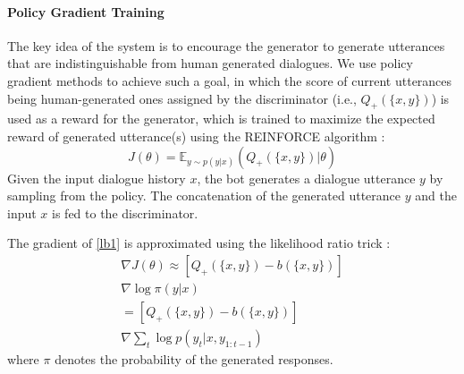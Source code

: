 \paragraph{Policy Gradient Training}
 The key idea of the system is to encourage the generator to generate utterances that are indistinguishable from human generated dialogues. We use policy gradient methods to achieve such a goal, in which the 
score of current utterances being human-generated ones assigned by the discriminator
(i.e.,  $Q_+(\{x,y\})$)
 is used as a reward for the generator, which is trained to maximize the expected reward of generated utterance(s) using the REINFORCE algorithm \cite{williams1992simple}:
 \begin{equation}
 J(\theta)=\mathbb{E}_{y\sim p(y|x)}(Q_+(\{x,y\})|\theta)
 \label{lb1}
 \end{equation}
Given the input dialogue history $x$, the  bot generates a dialogue utterance $y$ by sampling from the policy. 
The concatenation of the generated utterance $y$ and the input $x$ is fed to the discriminator. 
\begin{comment}
For multi-turn simulation, the second bot updates the dialogue history $x$ by adding 
the previous generated utterance, then samples another sequence $y'$  from the policy given the updated dialogue history $x$. 
The two bots take turns talking to each other (i.e.,
doing encoding and decoding) until the maximum number of simulation turns is reached. 
The discriminator then assigns a score to the entire simulated dialogue.
 \end{comment}
 The gradient of \eqref{lb1} is approximated using the likelihood ratio trick \cite{williams1992simple,glynn1990likelihood,aleksand1968stochastic}:
 \begin{multline}
\nabla J(\theta)\approx [Q_+(\{x,y\})-b(\{x,y\})] \\ \nabla\log \pi(y|x)
\\ = [Q_+(\{x,y\})-b(\{x,y\})] \\ \nabla\sum_t \log p(y_t|x,y_{1:t-1})
\label{partial}
\end{multline}
where $\pi$ denotes the probability of the generated responses. 
